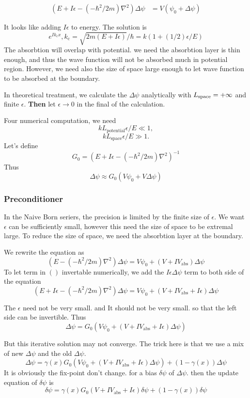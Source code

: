 \documentclass[12pt,twoside]{article}
\begin{document}
\begin{align}
(E + I\epsilon -(-\hbar^2/2m)\nabla^2)\Delta\psi &= V(\psi_0 + \Delta\psi)
\end{align}

It looks like adding $I\epsilon$ to energy. The solution is
$$
e^{I k_\text{c} x}, k_\text{c} = \sqrt{2m(E+I\epsilon)}/\hbar =  k(1+(1/2)\epsilon/E)
$$
The absorbtion will overlap with potential. we need the absorbtion layer is thin enough, and thus the wave function will not be absorbed much in potential region. However, we need also the size of space large enough to let wave function to be absorbed at the boundary.

In theoretical treatment, we calculate the $\Delta\psi$ analytically with $L_{\rm space}=+\infty$ and finite $\epsilon$.
\textbf{Then} let $\epsilon \rightarrow 0$ in the final of the calculation. 

Four numerical computation, we need $$kL_\text{potential} \epsilon/E \ll 1,$$ $$ k L_\text{space}\epsilon/E \gg 1.$$
Let's define
$$
G_0 = (E + I\epsilon-(-\hbar^2/2m)\nabla^2)^{-1}
$$
Thus
$$
\Delta\psi \approx G_0(V\psi_0 + V\Delta \psi)
$$




\subsubsection{Preconditioner}

In the Naive Born seriers, the precision is limited by the finite size of $\epsilon$.
We want $\epsilon$ can be sufficiently small, however this need the size of space to be extremal large. To reduce the size of space,
we need the absorbtion layer at the boundary.

We rewrite the equation as
\begin{equation}
(E - (-\hbar^2/2m)\nabla^2)\Delta\psi = V\psi_0 + (V + I V_\text{abs})\Delta \psi
\end{equation}
To let term in $()$ invertable numerically, we add the $I\epsilon\Delta\psi$ term to both side of the equation
$$
(E + I \epsilon - (-\hbar^2/2m)\nabla^2)\Delta\psi = V\psi_0 + (V + I V_\text{abs} + I \epsilon)\Delta \psi
$$

The $\epsilon$ need not be very small. and It should not be very small. so that the left side can be invertible. Thus
$$
\Delta\psi = G_0(V\psi_0 + (V+I V_\text{abs} + I\epsilon)\Delta \psi)
$$


But this iterative solution may not converge. The trick here is that we use a mix of new $\Delta \psi$ and the old $\Delta \psi$.
$$\Delta\psi = \gamma(x) G_0(V\psi_0 + (V+IV_\text{abs} + I\epsilon)\Delta \psi) + (1-\gamma(x))\Delta \psi$$
It is obviously the fix-point don't change. for a bias $\delta\psi$ of $\Delta\psi$. then the update equation of $\delta\psi$ is
$$
\delta\psi = \gamma(x)G_0 (V+IV_\text{abs}+I\epsilon)\delta\psi + (1-\gamma(x))\delta\psi
$$
\end{document}
